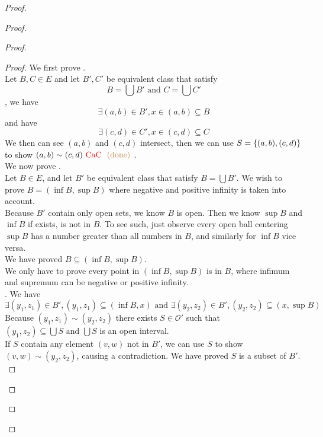 \documentclass{report}
\begin{document}
\begin{proof}
\begin{proof}
\begin{proof}
\begin{proof}
We first prove .\\

Let $B,C\in E$ and let $B',C'$ be equivalent class that satisfy
\begin{equation}
B=\bigcup B'\text{ and }C=\bigcup C'
\end{equation}
, we have
\begin{equation}
\exists (a,b)\in B', x\in (a,b)\subseteq B
\end{equation}
and have
\begin{equation}
\exists (c,d)\in C',x \in (c,d)\subseteq C
\end{equation}
We then can see $(a,b)$ and $(c,d)$ intersect, then we can use $S=\{ (a,b),(c,d) \}$ to show $(a,b)\sim (c,d)\text{ \textcolor{red}{CaC} }\textcolor{brown}{\text{ (done) }}$.\\

We now prove  .\\
 
Let $B\in E$, and let $B'$ be equivalent class that satisfy  $B=\bigcup B'$. We wish to prove $B=(\inf B,\sup B)$ where negative and positive infinity is taken into account.\\

Because $B'$ contain only open sets, we know  $B$ is open. Then we know $\sup  B$ and $\inf B$ if exists, is not in $B$. To see such, just observe every open ball centering $\sup B$ has a number greater than all numbers in $B$, and similarly for $\inf B$ vice versa.\\

We have proved $B\subseteq (\inf B,\sup B)$.\\

We only have to prove every point in $(\inf B,\sup  B)$ is in $B$, where infimum and supremum can be negative or positive infinity.\\

. We have
\begin{equation}
\exists (y_1,z_1)\in B', (y_1,z_1)\subseteq (\inf B,x)\text{ and }\exists (y_2,z_2)\in B', (y_2,z_2)\subseteq (x,\sup B)
\end{equation}
Because $(y_1,z_1)\sim (y_2,z_2)$ there exists $S\in \mathcal{O}'$ such that $(y_1,z_2)\subseteq \bigcup S\text{ and }\bigcup S$ is an open interval.\\

If $S$ contain any element  $(v,w)$ not in $B'$, we can use  $S$ to show  $(v,w)\sim (y_2,z_2)$, causing a contradiction. We have proved $S$ is a subset of  $B'$.\\


\end{proof}
\end{proof}
\end{proof}
\end{proof}
\end{document}
